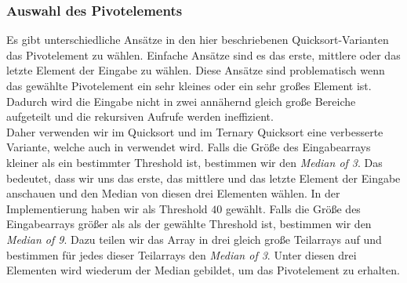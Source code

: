 \subsubsection{Auswahl des Pivotelements}

Es gibt unterschiedliche Ansätze in den hier beschriebenen Quicksort-Varianten das Pivotelement zu wählen. Einfache Ansätze sind es das erste, mittlere oder das letzte Element der Eingabe zu wählen. Diese Ansätze sind problematisch wenn das gewählte Pivotelement ein sehr kleines oder ein sehr großes Element ist. Dadurch wird die Eingabe nicht in zwei annähernd gleich große Bereiche aufgeteilt und die rekursiven Aufrufe werden ineffizient. \\
Daher verwenden wir im Quicksort und im Ternary Quicksort eine verbesserte Variante, welche auch in \cite{ternary_quicksort} verwendet wird. Falls die Größe des Eingabearrays kleiner als ein bestimmter Threshold ist, bestimmen wir den \emph{Median of 3}. Das bedeutet, dass wir uns das erste, das mittlere und das letzte Element der Eingabe anschauen und den Median von diesen drei Elementen wählen. In der Implementierung haben wir als Threshold $40$ gewählt. Falls die Größe des Eingabearrays größer als als der gewählte Threshold ist, bestimmen wir den \emph{Median of 9}. Dazu teilen wir das Array in drei gleich große Teilarrays auf und bestimmen für jedes dieser Teilarrays den \emph{Median of 3}. Unter diesen drei Elementen wird wiederum der Median gebildet, um das Pivotelement zu erhalten. 